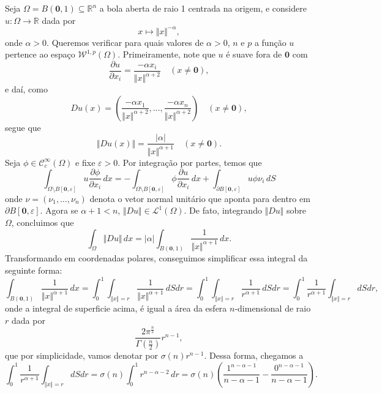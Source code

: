 \documentclass[a4paper, 11pt]{book}
\theoremstyle{definition}
\newcommand{\bR}{\mathbb{R}}
\newcommand{\cC}{\mathcal{C}}
\newcommand{\cL}{\mathcal{L}}
\newcommand{\cW}{\mathcal{W}}
\begin{document}
\begin{ex}
    Seja $\Omega = B(\mathbf{0},1) \subseteq \bR^n$ a bola aberta de raio 1 centrada na origem, e considere $u : \Omega \to \bR$ dada por
    \begin{equation}
        x \mapsto \Vert x \Vert^{-\alpha},
    \end{equation}
    onde $\alpha > 0$. Queremos verificar para quais valores de $\alpha > 0$, $n$ e $p$ a função $u$ pertence ao espaço $\cW^{1,p}(\Omega)$.
    Primeiramente, note que $u$ é suave fora de $\mathbf{0}$ com
    \[
        \dfrac{\partial u}{\partial x_i} = \frac{-\alpha x_i}{\Vert x \Vert^{\alpha + 2}} \quad (x \neq \mathbf{0}),
    \]
    e daí, como
    \[
        Du(x) = \left(\frac{-\alpha x_1}{\Vert x \Vert^{\alpha + 2}},\dots,\frac{-\alpha x_n}{\Vert x \Vert^{\alpha + 2}}  \right) \quad (x \neq \mathbf{0}),
    \]
    segue que
    \[
        \Vert Du(x) \Vert = \frac{|\alpha|}{\Vert x \Vert^{\alpha + 1}} \quad (x \neq \mathbf{0}).
    \]
    Seja $\phi \in \cC^\infty_c(\Omega)$ e fixe $\varepsilon > 0$. Por integração por partes, temos que
    \begin{equation}
        \int_{\Omega \setminus B[\mathbf{0}, \varepsilon]} u \dfrac{\partial \phi}{\partial x_i} \, dx = -\int_{\Omega \setminus B[\mathbf{0}, \varepsilon]} \phi \dfrac{\partial u}{\partial x_i} \,dx + \int_{\partial B[\mathbf{0},\varepsilon]} u \phi \nu_i \,dS
    \end{equation}
    onde $\nu = (\nu_1,\dots,\nu_n)$ denota o vetor normal unitário que aponta para dentro em $\partial B[\mathbf{0},\varepsilon]$.
    Agora se $\alpha + 1 < n$, $\Vert Du \Vert \in \cL^1(\Omega)$.
    De fato, integrando $\Vert Du \Vert$ sobre $\Omega$, concluimos que
    \[
        \int_\Omega \Vert Du \Vert \,dx = |\alpha|\int_{B(\mathbf{0},1)} \frac{1}{\Vert x \Vert^{\alpha+1}} \,dx.
    \]
    Transformando em coordenadas polares, conseguimos simplificar essa integral da seguinte forma:
    \[
        \int_{B(\mathbf{0},1)} \frac{1}{\Vert x \Vert^{\alpha+1}} \,dx =  \int_0^1 \int_{\Vert x \Vert = r} \frac{1}{\Vert x \Vert^{\alpha + 1}} \,dS dr = \int_0^1 \int_{\Vert x \Vert= r} \frac{1}{r^{\alpha + 1}} \, dS dr = \int_0^1 \frac{1}{r^{\alpha+1}}  \int_{\Vert x \Vert = r} dS dr,
    \]
    onde a integral de superficie acima, é igual a área da esfera $n$-dimensional de raio $r$ dada por
    \[
        \frac{2\pi^{\frac{n}{2}}}{\Gamma(\frac{n}{2})}r^{n-1},
    \]
    que por simplicidade, vamos denotar por $\sigma(n) r^{n-1}$. Dessa forma, chegamos a
    \[
        \int_0^1 \frac{1}{r^{\alpha+1}}  \int_{\Vert x \Vert = r} dS dr = \sigma(n)\int_0^1 r^{n-\alpha-2} \,dr = \sigma(n)\left(\frac{1^{n-\alpha-1}}{n-\alpha -1} - \frac{0^{n-\alpha-1}}{n-\alpha-1}\right).
\]
\end{ex}
\end{document}
